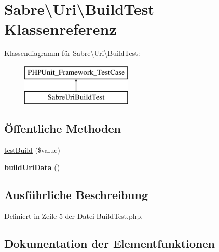 \hypertarget{class_sabre_1_1_uri_1_1_build_test}{}\section{Sabre\textbackslash{}Uri\textbackslash{}Build\+Test Klassenreferenz}
\label{class_sabre_1_1_uri_1_1_build_test}
Klassendiagramm für Sabre\textbackslash{}Uri\textbackslash{}Build\+Test\+:\begin{figure}[H]
\begin{center}
\leavevmode
\includegraphics[height=2.000000cm]{class_sabre_1_1_uri_1_1_build_test}
\end{center}
\end{figure}
\subsection*{Öffentliche Methoden}
\begin{DoxyCompactItemize}
\item 
\mbox{\hyperlink{class_sabre_1_1_uri_1_1_build_test_a6b6b6161811c6da081478ccacc035f5b}{test\+Build}} (\$value)
\item 
\mbox{\label{class_sabre_1_1_uri_1_1_build_test_afadf3c7b18013be8203cf1f8289b1c47}} 
{\bfseries build\+Uri\+Data} ()
\end{DoxyCompactItemize}


\subsection{Ausführliche Beschreibung}


Definiert in Zeile 5 der Datei Build\+Test.\+php.



\subsection{Dokumentation der Elementfunktionen}
\mbox{\label{class_sabre_1_1_uri_1_1_build_test_a6b6b6161811c6da081478ccacc035f5b}} 
